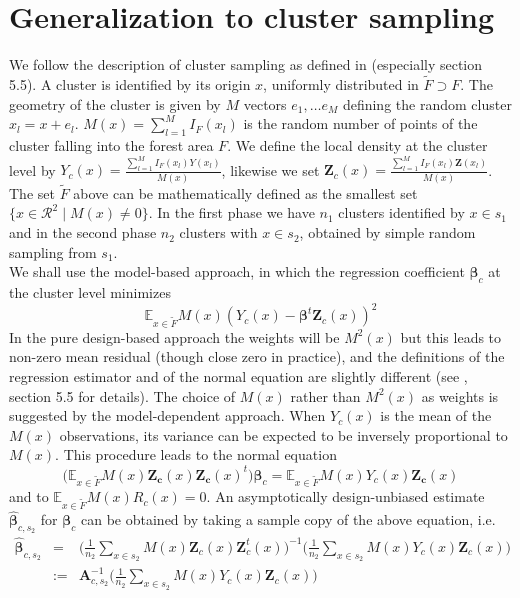 \documentclass[a4paper,12pt,leqno, titlepage]{article}
\newcommand{\EX}{\mathbb{E}}
\begin{document}
\section{Generalization to cluster sampling}
We follow the description of cluster sampling as defined in \cite{mandallaz} (especially section 5.5). A cluster is identified by its origin $x$, uniformly distributed in $\tilde{F}\supset F$. The geometry of the cluster is given by $M$ vectors $e_1,\ldots e_M$ defining the random cluster $x_l=x+e_l$. $M(x)=\sum_{l=1}^MI_{F}(x_l)$ is the random number of points of the cluster falling into the forest area $F$. We define the local density at the cluster level by $Y_c(x)=\frac{\sum_{l=1}^MI_{F}(x_l)Y(x_l)}{M(x)}$, likewise we set $\pmb{Z}_c(x)=\frac{\sum_{l=1}^MI_{F}(x_l)\pmb{Z}(x_l)}{M(x)}$. The set $\tilde{F}$ above can be mathematically defined as the smallest set $\{x\in{\mathcal{R}}^2 \mid M(x) \ne 0 \}$. In the first phase we have $n_1$ clusters identified by $x\in{s_1}$ and in the second phase $n_2$ clusters with $x\in{s_2}$, obtained by simple random sampling from $s_1$.\\
We shall use the model-based approach, in which the regression coefficient $\pmb{\beta}_c$ at the cluster level minimizes
$$\EX_{x\in{\tilde{F}}}M(x)(Y_c(x)-\pmb{\beta}^{t}\pmb{Z}_c(x))^2$$
In the pure design-based approach the weights will be $M^2(x)$ but this leads to non-zero mean residual (though close zero in practice), and the definitions of the regression estimator and of the normal equation are slightly different (see \cite{mandallaz}, section 5.5 for details). The choice of $M(x)$ rather than $M^2(x)$ as weights is suggested by the model-dependent approach. When $Y_c(x)$ is the mean of the
$M(x)$ observations, its variance can be expected to be inversely
proportional to $M(x)$.  This procedure  leads to the normal equation
$$\Big(\EX_{x\in{\tilde{F}}}M(x)\pmb{Z_c}(x)\pmb{Z_c}(x)^{t}\Big)\pmb{\beta}_c=\EX_{x\in{\tilde{F}}}M(x)Y_c(x)\pmb{Z_c}(x)$$
and to $\EX_{x\in{\tilde{F}}}M(x)R_c(x)=0$. An asymptotically design-unbiased estimate $\hat{\pmb{\beta}}_{c,s_2}$  for $\pmb{\beta}_c$ can be obtained  by taking a sample copy of the above equation, i.e.
 \begin{eqnarray}\label{estcluster1}
 \hat{\pmb{\beta}}_{c,s_2}&=&
 \Big(\frac{1}{n_2}\sum_{x\in{s_2}}M(x)\pmb{Z}_c(x)\pmb{Z}_c^t(x)\Big)^{-1}\Big(\frac{1}{n_2}\sum_{x\in{s_2}}M(x)Y_c(x)\pmb{Z}_c(x)\Big)
 \nonumber\\
 &:=&\pmb{A}^{-1}_{c,s_2}\Big(\frac{1}{n_2}\sum_{x\in{s_2}}M(x)Y_c(x)\pmb{Z}_c(x)\Big)
 \end{eqnarray}
\end{document}

